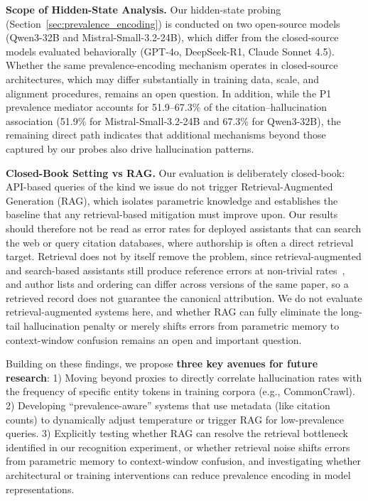 \documentclass[11pt]{article}
\begin{document}
\textbf{Scope of Hidden-State Analysis.} Our hidden-state probing (Section~\ref{sec:prevalence_encoding}) is conducted on two open-source models (Qwen3-32B and Mistral-Small-3.2-24B), which differ from the closed-source models evaluated behaviorally (GPT-4o, DeepSeek-R1, Claude Sonnet 4.5). Whether the same prevalence-encoding mechanism operates in closed-source architectures, which may differ substantially in training data, scale, and alignment procedures, remains an open question. In addition, while the P1 prevalence mediator accounts for 51.9--67.3\% of the citation--hallucination association (51.9\% for Mistral-Small-3.2-24B and 67.3\% for Qwen3-32B), the remaining direct path indicates that additional mechanisms beyond those captured by our probes also drive hallucination patterns.

\textbf{Closed-Book Setting vs RAG.} Our evaluation is deliberately closed-book: API-based queries of the kind we issue do not trigger Retrieval-Augmented Generation (RAG), which isolates parametric knowledge and establishes the baseline that any retrieval-based mitigation must improve upon. Our results should therefore not be read as error rates for deployed assistants that can search the web or query citation databases, where authorship is often a direct retrieval target. Retrieval does not by itself remove the problem, since retrieval-augmented and search-based assistants still produce reference errors at non-trivial rates~\citep{rao2026reference}, and author lists and ordering can differ across versions of the same paper, so a retrieved record does not guarantee the canonical attribution. We do not evaluate retrieval-augmented systems here, and whether RAG can fully eliminate the long-tail hallucination penalty or merely shifts errors from parametric memory to context-window confusion remains an open and important question.

Building on these findings, we propose \textbf{three key avenues for future research}: 1) Moving beyond proxies to directly correlate hallucination rates with the frequency of specific entity tokens in training corpora (e.g., CommonCrawl). 2) Developing ``prevalence-aware'' systems that use metadata (like citation counts) to dynamically adjust temperature or trigger RAG for low-prevalence queries.
3) Explicitly testing whether RAG can resolve the retrieval bottleneck identified in our recognition experiment, or whether retrieval noise shifts errors from parametric memory to context-window confusion, and investigating whether architectural or training interventions can reduce prevalence encoding in model representations.
\end{document}
